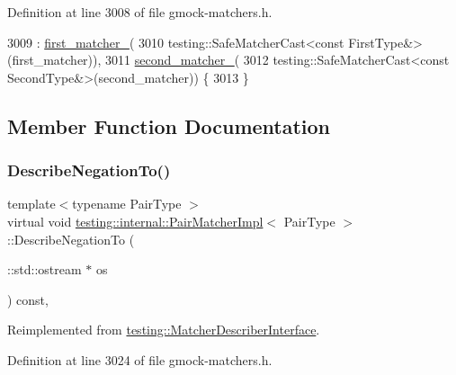 Definition at line 3008 of file gmock-\/matchers.\+h.


\begin{DoxyCode}
3009       : \hyperlink{classtesting_1_1internal_1_1PairMatcherImpl_a70e5a952ffd16886f5f1bacc718561f8}{first\_matcher\_}(
3010             testing::SafeMatcherCast<const FirstType&>(first\_matcher)),
3011         \hyperlink{classtesting_1_1internal_1_1PairMatcherImpl_a2341ad72afa02dcadb98c531cada3576}{second\_matcher\_}(
3012             testing::SafeMatcherCast<const SecondType&>(second\_matcher)) \{
3013   \}
\end{DoxyCode}


\subsection{Member Function Documentation}
\mbox{\label{classtesting_1_1internal_1_1PairMatcherImpl_a41ef8b1ae031cf342a380e2f2fb2a526}} 
\subsubsection{\texorpdfstring{Describe\+Negation\+To()}{DescribeNegationTo()}}
{\footnotesize\ttfamily template$<$typename Pair\+Type $>$ \\
virtual void \hyperlink{classtesting_1_1internal_1_1PairMatcherImpl}{testing\+::internal\+::\+Pair\+Matcher\+Impl}$<$ Pair\+Type $>$\+::Describe\+Negation\+To (\begin{DoxyParamCaption}\item[{\+::std\+::ostream $\ast$}]{os }\end{DoxyParamCaption}) const\hspace{0.3cm}{\ttfamily [inline]}, {\ttfamily [virtual]}}



Reimplemented from \hyperlink{classtesting_1_1MatcherDescriberInterface_a2071afbc47097c4d1c0064275af34db0}{testing\+::\+Matcher\+Describer\+Interface}.



Definition at line 3024 of file gmock-\/matchers.\+h.


